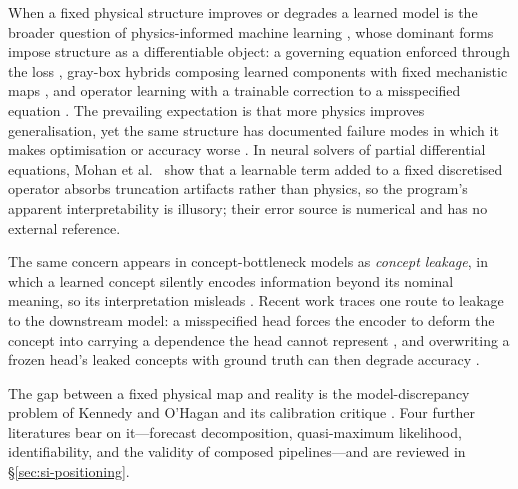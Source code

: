 When a fixed physical structure improves or degrades a learned model is the broader question of
physics-informed machine learning \cite{karniadakis2021}, whose dominant forms impose structure as a
differentiable object: a governing equation enforced through the loss \cite{raissi2019}, gray-box
hybrids composing learned components with fixed mechanistic maps \cite{willard2022}, and operator
learning with a trainable correction to a misspecified equation \cite{ma2026}. The prevailing
expectation is that more physics improves generalisation, yet the same structure has documented
failure modes in which it makes optimisation or accuracy worse \cite{krishnapriyan2021}. In neural
solvers of partial differential equations, Mohan et al.\ \cite{mohan2024} show that a learnable term
added to a fixed discretised operator absorbs truncation artifacts rather than physics, so the
program's apparent interpretability is illusory; their error source is numerical and has no external
reference.

The same concern appears in concept-bottleneck models as \emph{concept leakage}, in which a learned
concept silently encodes information beyond its nominal meaning, so its interpretation misleads
\cite{mahinpei2021,margeloiu2021,havasi2022}. Recent work traces one route to leakage to the downstream
model: a misspecified head forces the encoder to deform
the concept into carrying a dependence the head cannot represent \cite{parisini2025}, and overwriting a
frozen head's leaked concepts with ground truth can then degrade accuracy
\cite{espinosa2025leakage}.

The gap between a fixed physical map and reality
is the model-discrepancy problem of Kennedy and O'Hagan \cite{kennedy2001} and its calibration
critique \cite{brynjarsdottir2014}. Four further literatures bear on it---forecast decomposition,
quasi-maximum likelihood, identifiability, and the validity of composed pipelines---and are reviewed
in \S\ref{sec:si-positioning}.

